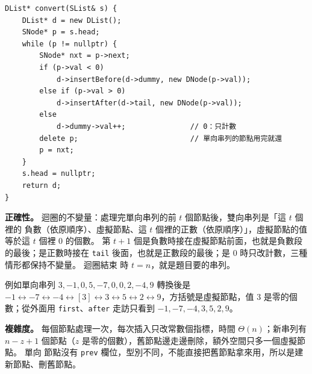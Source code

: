\begin{pastsoln}
\begin{verbatim}
DList* convert(SList& s) {
    DList* d = new DList();
    SNode* p = s.head;
    while (p != nullptr) {
        SNode* nxt = p->next;
        if (p->val < 0)
            d->insertBefore(d->dummy, new DNode(p->val));
        else if (p->val > 0)
            d->insertAfter(d->tail, new DNode(p->val));
        else
            d->dummy->val++;               // 0：只計數
        delete p;                          // 單向串列的節點用完就還
        p = nxt;
    }
    s.head = nullptr;
    return d;
}
\end{verbatim}

\textbf{正確性。} 迴圈的不變量：處理完單向串列的前 $t$ 個節點後，雙向串列是「這 $t$ 個裡的
負數（依原順序）、虛擬節點、這 $t$ 個裡的正數（依原順序）」，虛擬節點的值等於這 $t$ 個裡
$0$ 的個數。 第 $t + 1$ 個是負數時接在虛擬節點前面，也就是負數段的最後；是正數時接在
\texttt{tail} 後面，也就是正數段的最後；是 $0$ 時只改計數，三種情形都保持不變量。 迴圈結束
時 $t = n$，就是題目要的串列。

例如單向串列 $3, -1, 0, 5, -7, 0, 0, 2, -4, 9$ 轉換後是
$-1 \leftrightarrow -7 \leftrightarrow -4 \leftrightarrow [3] \leftrightarrow 3 \leftrightarrow 5
\leftrightarrow 2 \leftrightarrow 9$，方括號是虛擬節點，值 $3$ 是零的個數；從外面用
\texttt{first}、\texttt{after} 走訪只看到 $-1, -7, -4, 3, 5, 2, 9$。

\textbf{複雜度。} 每個節點處理一次，每次插入只改常數個指標，時間 $\Theta(n)$；新串列有
$n - z + 1$ 個節點（$z$ 是零的個數），舊節點邊走邊刪除，額外空間只多一個虛擬節點。 單向
節點沒有 \texttt{prev} 欄位，型別不同，不能直接把舊節點拿來用，所以是建新節點、刪舊節點。
\end{pastsoln}
